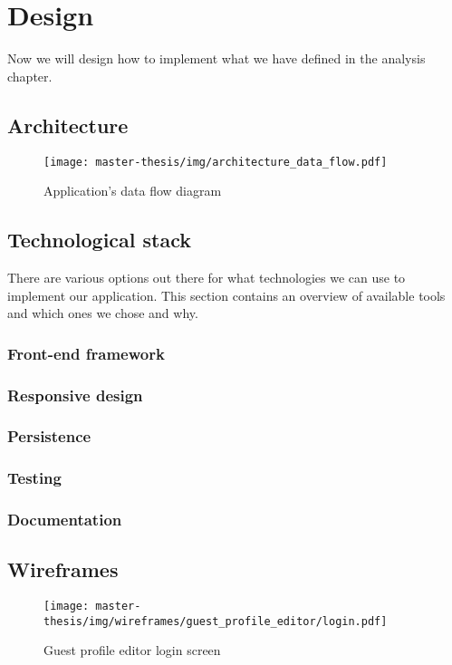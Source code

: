 \chapter{Design}
Now we will design how to implement what we have defined in the analysis chapter.

\section{Architecture}
\begin{figure}[h]
  \centering
  \texttt{[image: master-thesis/img/architecture\_data\_flow.pdf]}
  \caption{Application's data flow diagram}
\end{figure}

\section{Technological stack}
There are various options out there for what technologies we can use to implement our application.
This section contains an overview of available tools and which ones we chose and why.

\subsection{Front-end framework}

\subsection{Responsive design}

\subsection{Persistence}

\subsection{Testing}

\subsection{Documentation}

\section{Wireframes}
\begin{figure}[h]
  \centering
  \texttt{[image: master-thesis/img/wireframes/guest\_profile\_editor/login.pdf]}
  \caption{Guest profile editor login screen}
\end{figure}

